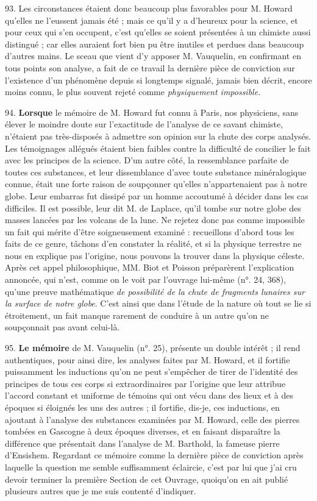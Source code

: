 \documentclass[a4paper, 11pt, oneside, polutonikogreek, french]{article}
\begin{document}
93. Les circonstances étaient donc beaucoup plus favorables pour M. Howard qu'elles ne l'eussent jamais été ; mais ce qu'il y a d'heureux pour la science, et pour ceux qui s'en occupent, c'est qu'elles se soient présentées à un chimiste aussi distingué ; car elles auraient fort bien pu être inutiles et perdues dans beaucoup d'autres mains. Le sceau que vient d'y apposer M. Vauquelin, en confirmant en tous points son analyse, a fait de ce travail la dernière pièce de conviction sur l'existence d'un phénomène depuis si longtemps signalé, jamais bien décrit, encore moins connu, le plus souvent rejeté comme \emph{physiquement impossible}.

94. \textbf{Lorsque} le mémoire de M. Howard fut connu à Paris, nos physiciens, sans élever le moindre doute sur l'exactitude de l'analyse de ce savant chimiste, n'étaient pas très-disposés à admettre son opinion sur la chute des corps analysés. Les témoignages allégués étaient bien faibles contre la difficulté de concilier le fait avec les principes de la science. D'un autre côté, la ressemblance parfaite de toutes ces substances, et leur dissemblance d'avec toute substance minéralogique connue, était une forte raison de soupçonner qu'elles n'appartenaient pas à notre globe. Leur embarras fut dissipé par un homme accoutumé à décider dans les cas difficiles. \og Il est possible, leur dit M. de Laplace, qu'il tombe sur notre globe des masses lancées par les volcans de la lune. Ne rejetez donc pas comme impossible un fait qui mérite d'être soigneusement examiné : recueillons d'abord tous les faits de ce genre, tâchons d'en constater la réalité, et si la physique terrestre ne nous en explique pas l'origine, nous pouvons la trouver dans la physique céleste. \fg Après cet appel philosophique, MM. Biot et Poisson préparèrent l'explication annoncée, qui n'est, comme on le voit par l'ouvrage lui-même (n°. 24, 368), qu'une preuve mathématique \emph{de possibilité de la chute de fragments lunaires sur la surface de notre globe}. C'est ainsi que dans l'étude de la nature où tout se lie si étroitement, un fait manque rarement de conduire à un autre qu'on ne soupçonnait pas avant celui-là.

95. \textbf{Le mémoire} de M. Vauquelin (n°. 25), présente un double intérêt ; il rend authentiques, pour ainsi dire, les analyses faites par M. Howard, et il fortifie puissamment les inductions qu'on ne peut s'empêcher de tirer de l'identité des principes de tous ces corps si extraordinaires par l'origine que leur attribue l'accord constant et uniforme de témoins qui ont vécu dans des lieux et à des époques si éloignés les uns des autres ; il fortifie, dis-je, ces inductions, en ajoutant à l'analyse des substances examinées par M. Howard, celle des pierres tombées en Gascogne à deux époques diverses, et en faisant disparaître la différence que présentait dans l'analyse de M. Barthold, la fameuse pierre d'Ensishem. Regardant ce mémoire comme la dernière pièce de conviction après laquelle la question me semble suffisamment éclaircie, c'est par lui que j'ai cru devoir terminer la première Section de cet Ouvrage, quoiqu'on en ait publié plusieurs autres que je me suis contenté d'indiquer.
\end{document}
